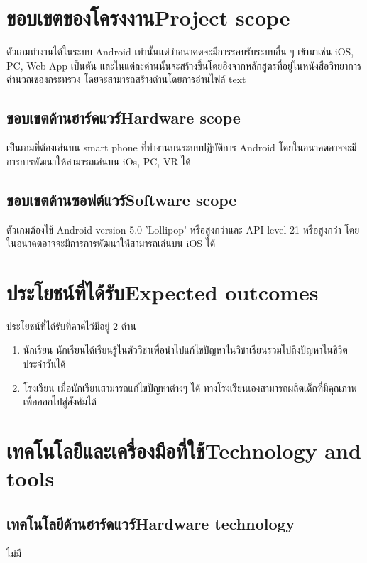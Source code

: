 \section{\ifcpe ขอบเขตของโครงงาน\else Project scope\fi}
ตัวเกมทำงานได้ในระบบ Android เท่านั้นแต่ว่าอนาคตจะมีการรอบรับระบบอื่น ๆ 
เข้ามาเช่น iOS, PC, Web App เป็นตัน 
และในแต่ละด่านนั้นจะสร้างขึ้นโดยอิงจากหลักสูตรที่อยู่ในหนังสือวิทยาการคำนวณของกระทรวง
โดยจะสามารถสร้างด่านโดยการอ่านไฟล์ text

\subsection{\ifcpe ขอบเขตด้านฮาร์ดแวร์\else Hardware scope\fi}
เป็นเกมที่ต้องเล่นบน smart phone ที่ทำงานบนระบบปฏิบัติการ Android โดยในอนาคตอาจจะมีการการพัฒนาให้สามารถเล่นบน iOs, PC, VR ได้

\subsection{\ifcpe ขอบเขตด้านซอฟต์แวร์\else Software scope\fi}
ตัวเกมต้องใช้ Android version 5.0 'Lollipop' หรือสูงกว่าและ API level 21 หรือสูงกว่า
โดยในอนาคตอาจจะมีการการพัฒนาให้สามารถเล่นบน iOS ได้

\section{\ifcpe ประโยชน์ที่ได้รับ\else Expected outcomes\fi}
ประโยชน์ที่ได้รับที่คาดไว้มีอยู่ 2 ด้าน 
\begin{enumerate}
    \item นักเรียน นักเรียนได้เรียนรู้ในตัววิชาเพื่อนำไปแก้ไขปัญหาในวิชาเรียนรวมไปถึงปัญหาในชีวิตประจำวันได้
    \item โรงเรียน เมื่อนักเรียนสามารถแก้ไขปัญหาต่างๆ ได้ ทางโรงเรียนเองสามารถผลิตเด็กที่มีคุณภาพเพื่อออกไปสู่สังคัมได้ 
\end{enumerate}

\section{\ifcpe เทคโนโลยีและเครื่องมือที่ใช้\else Technology and tools\fi}

\subsection{\ifcpe เทคโนโลยีด้านฮาร์ดแวร์\else Hardware technology\fi}
ไม่มี

